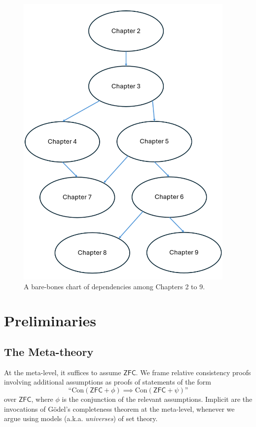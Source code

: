 \documentclass[12pt, twoside]{memoir}
\numberwithin{equation}{section}
\theoremstyle{definition}
\theoremstyle{remark}
\theoremstyle{definition}
\theoremstyle{definition}
\theoremstyle{definition}
\theoremstyle{remark}
\begin{document}
\begin{figure}[!ht]
    \centering
    \centerline{\includegraphics[width=0.95\textwidth]{Chapteral_Dependencies.png}}
    \captionsetup{width=\textwidth, format=hang}
    \caption[Dependencies among chapters]{A bare-bones chart of dependencies among Chapters 2 to 9.}
    \label{chapteral}
\end{figure}

\chapter{Preliminaries}\label{sect15}

\section{The Meta-theory}\label{subs21}

At the meta-level, it suffices to assume $\mathsf{ZFC}$. We frame relative consistency proofs involving additional assumptions as proofs of statements of the form $$\text{``}\mathrm{Con}(\mathsf{ZFC} + \phi) \implies \mathrm{Con}(\mathsf{ZFC} + \psi)\text{''}$$ over $\mathsf{ZFC}$, where $\phi$ is the conjunction of the relevant assumptions. Implicit are the invocations of G\"{o}del's completeness theorem at the meta-level, whenever we argue using models (a.k.a. \emph{universes}) of set theory.
\end{document}

